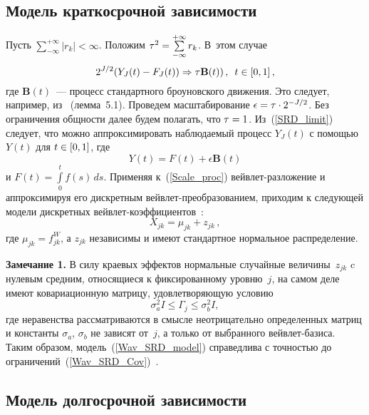 \begin{multicols}{2}
\subsection{Модель краткосрочной зависимости}

Пусть $\sum\limits_{-\infty}^{+\infty} |r_k| < \infty$.
Положим $\tau^2 \hm= \sum\limits_{-\infty}^{+\infty} r_k$.
В~этом случае
\begin{equation}
2^{J/2}(Y_J(t)-F_J(t)) \Rightarrow \tau \mathbf{B}(t))\,, \enskip t \in [0,1]\,,
\label{SRD_limit}
\end{equation}
где $\mathbf{B}(t)$~--- процесс стандартного броуновского движения. Это следует, 
например, из~\cite{18-she} (лемма~5.1).
Проведем масштабирование $\epsilon\hm = \tau \cdot 2^{-J/2}$. Без ограничения общности 
далее будем полагать, что $\tau\hm=1$. Из~(\ref{SRD_limit}) следует, 
что можно аппроксимировать наблюдаемый процесс $Y_J(t)$ с помощью $Y(t)$ 
для $t \hm\in [0,1]$, где
\begin{equation}
Y(t) = F(t) + \epsilon \mathbf{B}(t)
\label{Scale_proc}
\end{equation}
и $F(t)= \int\limits_0^t f(s)\,d s$. Применяя к~(\ref{Scale_proc}) вейв\-лет-раз\-ло\-же\-ние 
и аппроксимируя его дискретным вейв\-лет-пре\-обра\-зо\-ва\-ни\-ем, приходим к следующей модели 
дискретных вейв\-лет-ко\-эф\-фи\-ци\-ен\-тов~\cite{16-she}:
\begin{equation}
X_{jk} = \mu_{jk} +  z_{jk}\,,
\label{Wav_SRD_model}
\end{equation}
где $\mu_{jk}=f^{W}_{jk}$, а  $z_{jk}$ независимы и имеют стандартное 
нормальное распределение.

\smallskip

\noindent
\textbf{Замечание 1.} В силу краевых эффектов нормальные случайные величины~$z_{jk}$ 
c нулевым средним, относящиеся к фиксированному уровню~$j$, на самом деле имеют 
ковариационную матрицу, удовлетворяющую условию
\begin{equation}
\sigma_a^2 I \leqslant \Gamma_j \leqslant \sigma_b^2 I,
\label{Wav_SRD_Cov}
\end{equation}
где неравенства рассматриваются в смысле неотрицательно определенных матриц и 
константы $\sigma_a$, $\sigma_b$ не зависят от~$j$, а только от выбранного вейв\-лет-ба\-зи\-са. 
Таким образом, модель~(\ref{Wav_SRD_model}) справедлива с точностью до 
ограничений~(\ref{Wav_SRD_Cov})~\cite{16-she}.

\subsection{Модель долгосрочной зависимости}


\end{multicols}
